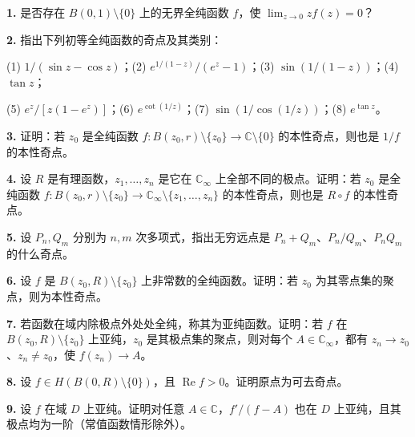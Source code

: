 \documentclass[11pt,a4paper]{article}
\begin{document}
\par{}
\noindent\textbf{1.} 是否存在 \(B(0,1)\setminus\{0\}\) 上的无界全纯函数 \(f\)，使
\(\lim_{z\to0}zf(z)=0\)？

\par{}
\noindent\textbf{2.} 指出下列初等全纯函数的奇点及其类别：

(1) \(1/(\sin z-\cos z)\)；(2) \(e^{1/(1-z)}/(e^z-1)\)；(3)
\(\sin(1/(1-z))\)；(4) \(\tan z\)；

(5) \(e^z/[z(1-e^z)]\)；(6) \(e^{\cot(1/z)}\)；(7)
\(\sin(1/\cos(1/z))\)；(8) \(e^{\tan z}\)。

\par{}
\noindent\textbf{3.} 证明：若 \(z_0\) 是全纯函数
\(f:B(z_0,r)\setminus\{z_0\}\to\mathbb C\setminus\{0\}\)
的本性奇点，则也是 \(1/f\) 的本性奇点。

\par{}
\noindent\textbf{4.} 设 \(R\) 是有理函数，\(z_1,\ldots,z_n\) 是它在
\(\mathbb C_\infty\) 上全部不同的极点。证明：若 \(z_0\) 是全纯函数
\(f:B(z_0,r)\setminus\{z_0\}\to\mathbb C_\infty\setminus\{z_1,\ldots,z_n\}\)
的本性奇点，则也是 \(R\circ f\) 的本性奇点。

\par{}
\noindent\textbf{5.} 设 \(P_n,Q_m\) 分别为 \(n,m\) 次多项式，指出无穷远点是
\(P_n+Q_m\)、\(P_n/Q_m\)、\(P_nQ_m\) 的什么奇点。

\par{}
\noindent\textbf{6.} 设 \(f\) 是 \(B(z_0,R)\setminus\{z_0\}\)
上非常数的全纯函数。证明：若 \(z_0\) 为其零点集的聚点，则为本性奇点。

\par{}
\noindent\textbf{7.} 若函数在域内除极点外处处全纯，称其为亚纯函数。证明：若 \(f\)
在 \(B(z_0,R)\setminus\{z_0\}\) 上亚纯，\(z_0\)
是其极点集的聚点，则对每个 \(A\in\mathbb C_\infty\)，都有
\(z_n\to z_0\)、\(z_n\ne z_0\)，使 \(f(z_n)\to A\)。

\par{}
\noindent\textbf{8.} 设 \(f\in H(B(0,R)\setminus\{0\})\)，且
\(\operatorname{Re}f>0\)。证明原点为可去奇点。

\par{}
\noindent\textbf{9.} 设 \(f\) 在域 \(D\) 上亚纯。证明对任意
\(A\in\mathbb C\)，\(f'/(f-A)\) 也在 \(D\)
上亚纯，且其极点均为一阶（常值函数情形除外）。
\end{document}
